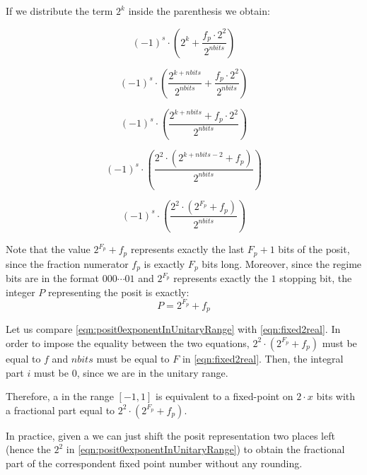 If we distribute the term $2^k$ inside the parenthesis we obtain:

\begin{equation*}
    (-1)^s \cdot \left ( 2^k + \frac{f_p\cdot 2^2}{2^{nbits}} \right )
\end{equation*}

\begin{equation*}
    (-1)^s \cdot \left ( \frac{2^{k+nbits}}{2^{nbits}} + \frac{f_p\cdot 2^2}{2^{nbits}} \right )
\end{equation*}

\begin{equation*}
    (-1)^s \cdot \left ( \frac{2^{k+nbits} + f_p\cdot 2^2}{2^{nbits}} \right )
\end{equation*}

\begin{equation*}
    (-1)^s \cdot \left ( \frac{2^2 \cdot (2^{k+ nbits - 2} + f_p)}{2^{nbits}} \right )
\end{equation*}

\begin{equation}\label{eqn:posit0exponentInUnitaryRange}
    (-1)^s \cdot \left ( \frac{2^2 \cdot (2^{F_p} + f_p)}{2^{nbits}} \right )
\end{equation}

Note that the value $2^{F_p} + f_p$ represents exactly the last $F_p + 1$ bits of the posit, since the fraction numerator $f_p$ is exactly $F_p$ bits long. Moreover, since the regime bits are in the format $000 \cdots 01$ and $2^{F_p}$ represents exactly the $1$ stopping bit, the integer $P$ representing the posit is exactly:
\begin{equation}\label{eqn:posit0expUnitary}
    P = 2^{F_p} + f_p
\end{equation}

Let us compare \eqref{eqn:posit0exponentInUnitaryRange} with \eqref{eqn:fixed2real}. In order to impose the equality between the two equations, $2^2 \cdot ( 2^{F_p} + f_p )$ must be equal to $f$ and $nbits$ must be equal to $F$ in \eqref{eqn:fixed2real}. Then, the integral part $i$ must be 0, since we are in the unitary range.

Therefore,  a  in the range $[-1,1]$ is equivalent to a fixed-point on $2\cdot x$ bits with a fractional part equal to $2^2 \cdot ( 2^{F_p} + f_p )$.

In practice, given a  we can just shift the posit representation two places left (hence the $2^2$ in \eqref{eqn:posit0exponentInUnitaryRange}) to obtain the fractional part of the correspondent fixed point number without any rounding.


